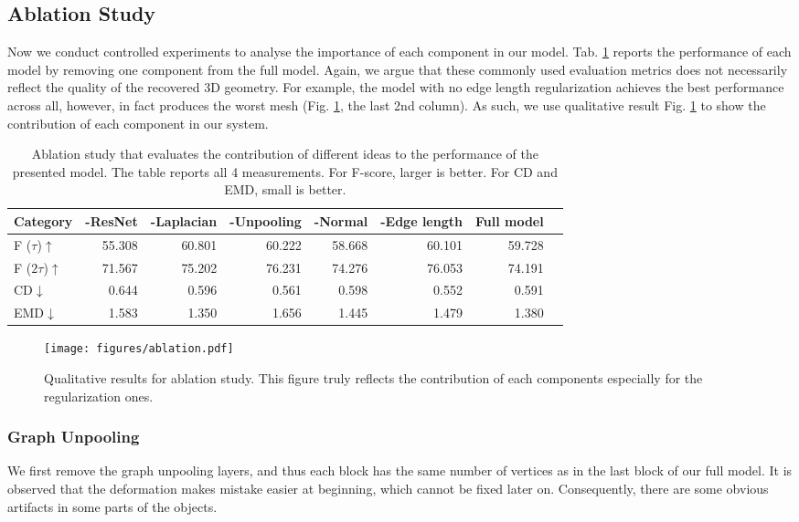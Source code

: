 \documentclass[runningheads]{llncs}
\newcommand{\figref}[1]{Fig. \ref{#1}}
\newcommand{\tabref}[1]{Tab. \ref{#1}}
\begin{document}
\subsection{Ablation Study} 
Now we conduct controlled experiments to analyse the importance of each component in our model. \tabref{tab:ablation} reports the performance of each model by removing one component from the full model. Again, we argue that these commonly used evaluation metrics does not necessarily reflect the quality of the recovered 3D geometry.
For example, the model with no edge length regularization achieves the best performance across all, however, in fact produces the worst mesh (\figref{fig:ablation}, the last 2nd column). As such, we use qualitative result \figref{fig:ablation} to show the contribution of each component in our system.



\begin{table}[t]
\centering
\setlength{\tabcolsep}{0.95mm}
\renewcommand{\arraystretch}{1.2}
\small
\begin{tabular}{@{}lrrrrrrr@{}}
\hline
Category & -ResNet & -Laplacian & -Unpooling & -Normal & -Edge length & Full model\\
\hline
\hline
F ($\tau$)$\uparrow$ & 55.308 & 60.801 & 60.222 & 58.668 & 60.101 & 59.728 \\
F ($2\tau$)$\uparrow$ & 71.567 & 75.202 & 76.231 & 74.276 & 76.053 & 74.191 \\
CD$\downarrow$ & 0.644 & 0.596 & 0.561 & 0.598 & 0.552 & 0.591 \\
EMD$\downarrow$ & 1.583 & 1.350 & 1.656 & 1.445 & 1.479 & 1.380 \\
\hline
\end{tabular}
\caption{Ablation study that evaluates the contribution of different ideas to the performance of the presented model. The table reports all 4 measurements. For F-score, larger is better. For CD and EMD, small is better. }
\label{tab:ablation}
\end{table}

\begin{figure}[tbhp]
\centering
\texttt{[image: figures/ablation.pdf]}
\caption{Qualitative results for ablation study. This figure truly reflects the contribution of each components especially for the regularization ones.}
\label{fig:ablation}
\end{figure}

\subsubsection{Graph Unpooling}
We first remove the graph unpooling layers, and thus each block has the same number of vertices as in the last block of our full model. It is observed that the deformation makes mistake easier at beginning, which cannot be fixed later on. Consequently, there are some obvious artifacts in some parts of the objects.
\end{document}

